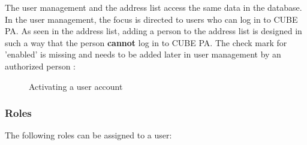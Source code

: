 The user management and the address list access the same data in the database. In the user management, the focus is directed to users who can log in to CUBE PA. As seen in the address list, adding a person to the address list is designed in such a way that the person \textbf{cannot} log in to CUBE PA. The check mark for 'enabled' is missing and needs to be added later in user management by an authorized person :

\begin{figure}[H]
\caption{Activating a user account}
\end{figure}

\vspace{-10pt}

\subsubsection{Roles}
\label{bkm:Ref445361985}

The following roles can be assigned to a user:

